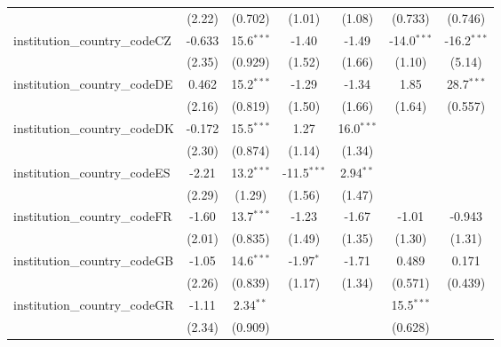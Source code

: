 \begin{tabular}{lcccccc}
                                         & (2.22)        & (0.702)       & (1.01)        & (1.08)        & (0.733)       & (0.746)\\   
   institution\_country\_codeCZ          & -0.633        & 15.6$^{***}$  & -1.40         & -1.49         & -14.0$^{***}$ & -16.2$^{***}$\\   
                                         & (2.35)        & (0.929)       & (1.52)        & (1.66)        & (1.10)        & (5.14)\\   
   institution\_country\_codeDE          & 0.462         & 15.2$^{***}$  & -1.29         & -1.34         & 1.85          & 28.7$^{***}$\\   
                                         & (2.16)        & (0.819)       & (1.50)        & (1.66)        & (1.64)        & (0.557)\\   
   institution\_country\_codeDK          & -0.172        & 15.5$^{***}$  & 1.27          & 16.0$^{***}$  &               &   \\   
                                         & (2.30)        & (0.874)       & (1.14)        & (1.34)        &               &   \\   
   institution\_country\_codeES          & -2.21         & 13.2$^{***}$  & -11.5$^{***}$ & 2.94$^{**}$   &               &   \\   
                                         & (2.29)        & (1.29)        & (1.56)        & (1.47)        &               &   \\   
   institution\_country\_codeFR          & -1.60         & 13.7$^{***}$  & -1.23         & -1.67         & -1.01         & -0.943\\   
                                         & (2.01)        & (0.835)       & (1.49)        & (1.35)        & (1.30)        & (1.31)\\   
   institution\_country\_codeGB          & -1.05         & 14.6$^{***}$  & -1.97$^{*}$   & -1.71         & 0.489         & 0.171\\   
                                         & (2.26)        & (0.839)       & (1.17)        & (1.34)        & (0.571)       & (0.439)\\   
   institution\_country\_codeGR          & -1.11         & 2.34$^{**}$   &               &               & 15.5$^{***}$  &   \\   
                                         & (2.34)        & (0.909)       &               &               & (0.628)       &   \\   

\end{tabular}

